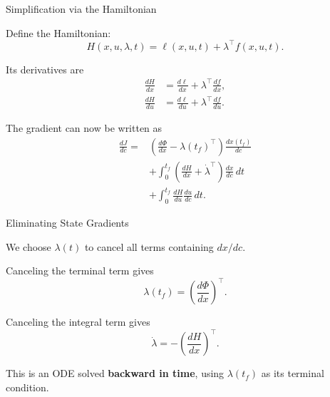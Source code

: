 \documentclass{beamer}
\begin{document}
\begin{frame}{Simplification via the Hamiltonian}
	\begin{flushleft}
		Define the Hamiltonian:
		\[
		\boxed{
			H(x,u,\lambda,t)=\ell(x,u,t)+\lambda^\top f(x,u,t).
		}
		\]
		
		Its derivatives are
		\[
		\begin{aligned}
			\frac{dH}{dx}
			&=\frac{d\ell}{dx}+\lambda^\top\frac{df}{dx},\\
			\frac{dH}{du}
			&=\frac{d\ell}{du}+\lambda^\top\frac{df}{du}.
		\end{aligned}
		\]
		
		\bigskip
		
		The gradient can now be written as
		\[
		\boxed{
			\begin{aligned}
				\frac{dJ}{dc}
				={}&
				\left(\frac{d\Phi}{dx}-\lambda(t_f)^\top\right)
				\frac{dx(t_f)}{dc}\\
				&+\int_0^{t_f}
				\left(\frac{dH}{dx}+\dot{\lambda}^\top\right)
				\frac{dx}{dc}\,dt\\
				&+\int_0^{t_f}\frac{dH}{du}\frac{du}{dc}\,dt.
			\end{aligned}
		}
		\]
	\end{flushleft}
\end{frame}

\begin{frame}{Eliminating State Gradients}
	\begin{flushleft}
		We choose $\lambda(t)$ to cancel all terms containing
		$dx/dc$.
		
		\bigskip
		
		Canceling the terminal term gives
		\[
		\boxed{
			\lambda(t_f)=\left(\frac{d\Phi}{dx}\right)^\top.
		}
		\]
		
		\bigskip
		
		Canceling the integral term gives
		\[
		\boxed{
			\dot{\lambda}
			=-\left(\frac{dH}{dx}\right)^\top.
		}
		\]
		
		\bigskip
		
		This is an ODE solved \textbf{backward in time},
		using $\lambda(t_f)$ as its terminal condition.
	\end{flushleft}
\end{frame}
\end{document}

